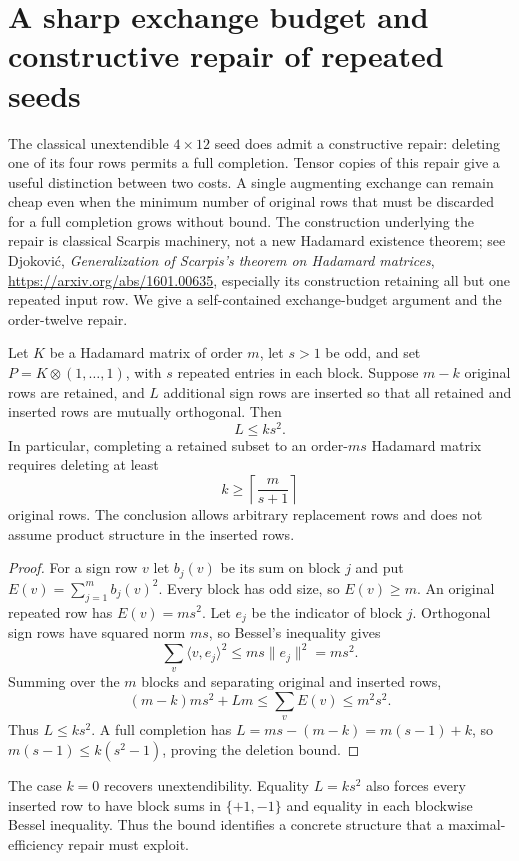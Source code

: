 \section{A sharp exchange budget and constructive repair of repeated seeds}
\label{sec:completion-budget}

The classical unextendible $4\times12$ seed does admit a constructive
repair: deleting one of its four rows permits a full completion.
Tensor copies of this repair give a useful distinction between two
costs. A single augmenting exchange can remain cheap even when the
minimum number of original rows that must be discarded for a full
completion grows without bound. The construction underlying the repair
is classical Scarpis machinery, not a new Hadamard existence theorem;
see Djokovi\'c, \emph{Generalization of Scarpis's theorem on Hadamard
matrices}, \url{https://arxiv.org/abs/1601.00635}, especially its
construction retaining all but one repeated input row. We give a
self-contained exchange-budget argument and the order-twelve repair.


\begin{theorem}
Let $K$ be a Hadamard matrix of order $m$, let $s>1$ be odd, and set
$P=K\otimes(1,\ldots,1)$, with $s$ repeated entries in each block.
Suppose $m-k$ original rows are retained, and $L$ additional sign rows
are inserted so that all retained and inserted rows are mutually
orthogonal. Then
\[
 L\le k s^2.
\]
In particular, completing a retained subset to an order-$ms$ Hadamard
matrix requires deleting at least
\[
 k\ge\left\lceil\frac{m}{s+1}\right\rceil
\]
original rows. The conclusion allows arbitrary replacement rows and
does not assume product structure in the inserted rows.
\end{theorem}
\begin{proof}
For a sign row $v$ let $b_j(v)$ be its sum on block $j$ and put
$E(v)=\sum_{j=1}^m b_j(v)^2$. Every block has odd size, so $E(v)\ge m$.
An original repeated row has $E(v)=ms^2$.
Let $e_j$ be the indicator of block $j$. Orthogonal sign rows have
squared norm $ms$, so Bessel's inequality gives
\[
 \sum_v\langle v,e_j\rangle^2\le ms\|e_j\|^2=ms^2.
\]
Summing over the $m$ blocks and separating original and inserted rows,
\[
 (m-k)ms^2+Lm\le\sum_v E(v)\le m^2s^2.
\]
Thus $L\le ks^2$. A full completion has
$L=ms-(m-k)=m(s-1)+k$, so
$m(s-1)\le k(s^2-1)$, proving the deletion bound.
\end{proof}

The case $k=0$ recovers unextendibility. Equality $L=ks^2$ also forces
every inserted row to have block sums in $\{+1,-1\}$ and equality in
each blockwise Bessel inequality. Thus the bound identifies a concrete
structure that a maximal-efficiency repair must exploit.

